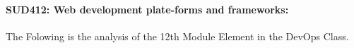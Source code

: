 \documentclass[12pt]{extreport}
\begin{document}
\begin{comment}
\subparagraph{Interpretation of the Box-plots:}
For This Element 

\begin{enumerate}	
	\item The MP Class Box-Plot:
	\begin{enumerate}
		\item MAX = a {} {} {} {} {} {} {} {} UQ = b {} {} {} {} {} {} {} {} Median = c
		\item LQ = d {} {} {} {} {} {} {} {}  MIN =	l {} {} {} {} {} {} {} {}  IQR = e - f = g
	\end{enumerate}
	\item The PSI Class Box-Plot:
	\begin{enumerate}
		\item MAX = a {} {} {} {} {} {} {} {} UQ = b {} {} {} {} {} {} {} {} Median = c
		\item LQ = d {} {} {} {} {} {} {} {}  MIN =	e {} {} {} {} {} {} {} {} IQR = f - g = h	
	\end{enumerate}
	\item The TSI Class Box-Plot:
	\begin{enumerate}
		\item MAX = a {} {} {} {} {} {} {} {} UQ = b {} {} {} {} {} {} {} {} Median = c
		\item LQ = d {} {} {} {} {} {} {} {} MIN = e {} {} {} {} {} {} {} {} IQR = f - g = h	
	\end{enumerate}
\end{enumerate}



\subparagraph{Interpretation of the histogram:}
This Frequency Distribution is (Skeness) with the following descriptive statistics:
\begin{enumerate}
	\item Mean = 
	\item STD = 
	\item Range = a - b = c
	\item IQR = a-b = c 
\end{enumerate}

\end{comment}


\paragraph{\large SUD412: Web development plate-forms and frameworks:\\
} 
The Folowing is the analysis of the 12th Module Element in the DevOps Class.
\end{document}
